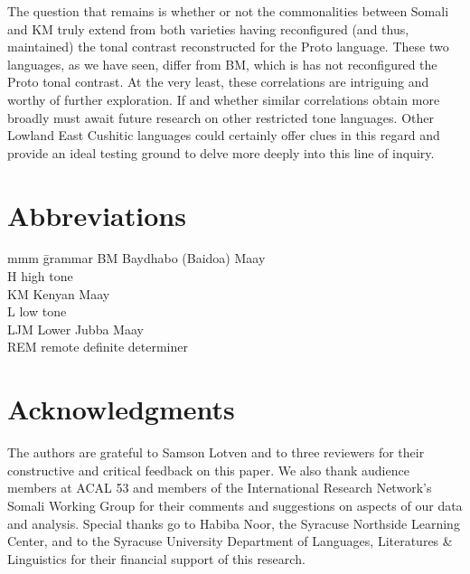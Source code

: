 \documentclass[output=paper,colorlinks,citecolor=brown]{langscibook}
\begin{document}
\begin{sloppypar}
The question that remains is whether or not the commonalities between Somali and KM truly extend from both varieties having reconfigured (and thus, maintained) the tonal contrast reconstructed for the Proto language. These two languages, as we have seen, differ from BM, which is has not reconfigured the Proto tonal contrast. At the very least, these correlations are intriguing and worthy of further exploration. If and whether similar correlations obtain more broadly must await future research on other restricted tone languages. Other Lowland East Cushitic languages could certainly offer clues in this regard and provide an ideal testing ground to delve more deeply into this line of inquiry.
\end{sloppypar}


\section*{Abbreviations}
\begin{multicols}{2}
\begin{tabbing}
mmm   \= grammar \kill
BM    \> Baydhabo (Baidoa) Maay \\
H     \> high tone \\
KM    \> Kenyan Maay \\
L     \> low tone \\
LJM   \> Lower Jubba Maay \\
REM   \> remote definite determiner 
\end{tabbing}
\end{multicols}

\section*{Acknowledgments}
The authors are grateful to Samson Lotven and to three reviewers for their constructive and critical feedback on this paper. We also thank audience members at ACAL 53 and members of the International Research Network's Somali Working Group for their comments and suggestions on aspects of our data and analysis. Special thanks go to Habiba Noor, the Syracuse Northside Learning Center, and to the Syracuse University Department of Languages, Literatures \& Linguistics for their financial support of this research. 

\printbibliography[heading=subbibliography,notkeyword=this]
\end{document}
